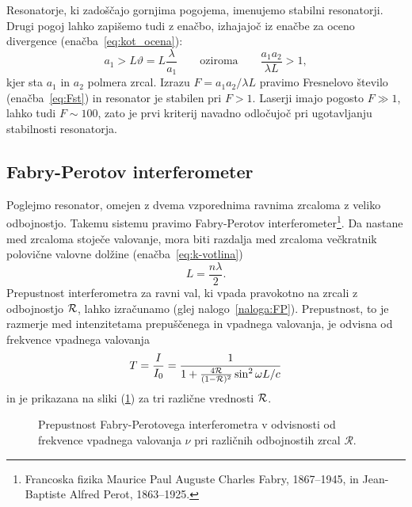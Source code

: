 Resonatorje, ki zadoščajo gornjima pogojema, imenujemo stabilni 
resonatorji.
Drugi pogoj lahko zapišemo tudi z enačbo, izhajajoč iz enačbe za oceno divergence (enačba~\ref{eq:kot_ocena}):
\begin{equation}
a_1 > L \vartheta = L\frac{\lambda}{a_1}\qquad \mathrm{oziroma} \qquad
\frac{a_{1}a_{2}}{\lambda L}>1,
\label{eq:Fresnelovo_stevilo}
\end{equation}
kjer sta $a_{1}$ in $a_{2}$ polmera zrcal. Izrazu 
$
F = a_{1}a_{2}/\lambda L
$
pravimo Fresnelovo število (enačba~\ref{eq:Fst})
in resonator je stabilen pri $F>1$. Laserji imajo pogosto $F\gg 1$, lahko tudi $F \sim 100$, zato je 
prvi kriterij navadno odločujoč pri ugotavljanju stabilnosti resonatorja.

\subsection*{Fabry-Perotov interferometer}
Poglejmo resonator, omejen z dvema vzporednima ravnima zrcaloma
z veliko odbojnostjo. Takemu sistemu pravimo Fabry-Perotov 
interferometer\footnote{Francoska fizika Maurice Paul Auguste Charles Fabry, 1867--1945, in 
Jean-Baptiste Alfred Perot, 1863--1925.}. 
Da nastane med zrcaloma stoječe valovanje, mora biti razdalja 
med zrcaloma večkratnik polovične valovne dolžine (enačba~\ref{eq:k-votlina})
\begin{equation}
L = \frac{n \lambda}{2}.
\end{equation}
Prepustnost interferometra za ravni val, ki vpada pravokotno na zrcali z
odbojnostjo ${\cal R}$, lahko izračunamo (glej nalogo~\ref{naloga:FP}). Prepustnost, to je 
razmerje med intenzitetama prepuščenega in vpadnega valovanja, je odvisna
od frekvence vpadnega valovanja
\begin{equation}
T=\frac{I}{I_0} = \frac{1}{1+\frac{4{\cal R}}{(1-{\cal R})^{2}}\sin^{2}\omega L/c}
\label{eq:Fabry-Perot-prepustnost}
\end{equation}
in je prikazana na sliki (\ref{fig:Fabry-Perot}) za tri različne vrednosti ${\cal R}$.
\begin{figure}[h!]
\centering
\def\svgwidth{95truemm} 

\caption{
Prepustnost Fabry-Perotovega interferometra
v odvisnosti od frekvence vpadnega valovanja $\nu$ pri različnih odbojnostih zrcal
$\mathcal{R}.$}
\label{fig:Fabry-Perot}
\end{figure}

